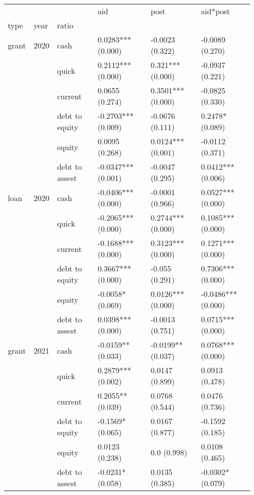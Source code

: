 \begin{tabular}{llllll}
\toprule
     &      &                &                 aid &               post &            aid*post \\
type & year & ratio &                     &                    &                     \\
\midrule
grant & 2020 & cash &   0.0283*** (0.000) &    -0.0023 (0.322) &     -0.0089 (0.270) \\
     &      & quick &   0.2112*** (0.000) &   0.321*** (0.000) &     -0.0937 (0.221) \\
     &      & current &      0.0655 (0.274) &  0.3501*** (0.000) &     -0.0825 (0.330) \\
     &      & debt to equity &  -0.2703*** (0.009) &    -0.0676 (0.111) &     0.2478* (0.089) \\
     &      & equity &      0.0095 (0.268) &  0.0124*** (0.001) &     -0.0112 (0.371) \\
     &      & debt to assest &  -0.0347*** (0.001) &    -0.0047 (0.295) &   0.0412*** (0.006) \\
loan & 2020 & cash &  -0.0406*** (0.000) &    -0.0001 (0.966) &   0.0527*** (0.000) \\
     &      & quick &  -0.2065*** (0.000) &  0.2744*** (0.000) &   0.1085*** (0.000) \\
     &      & current &  -0.1688*** (0.000) &  0.3123*** (0.000) &   0.1271*** (0.000) \\
     &      & debt to equity &   0.3667*** (0.000) &     -0.055 (0.291) &   0.7306*** (0.000) \\
     &      & equity &    -0.0058* (0.069) &  0.0126*** (0.000) &  -0.0486*** (0.000) \\
     &      & debt to assest &   0.0398*** (0.000) &    -0.0013 (0.751) &   0.0715*** (0.000) \\
grant & 2021 & cash &   -0.0159** (0.033) &  -0.0199** (0.037) &   0.0768*** (0.000) \\
     &      & quick &   0.2879*** (0.002) &     0.0147 (0.899) &      0.0913 (0.478) \\
     &      & current &    0.2055** (0.039) &     0.0768 (0.544) &      0.0476 (0.736) \\
     &      & debt to equity &    -0.1569* (0.065) &     0.0167 (0.877) &     -0.1592 (0.185) \\
     &      & equity &      0.0123 (0.238) &        0.0 (0.998) &      0.0108 (0.465) \\
     &      & debt to assest &    -0.0231* (0.058) &     0.0135 (0.385) &    -0.0302* (0.079) \\

\end{tabular}
